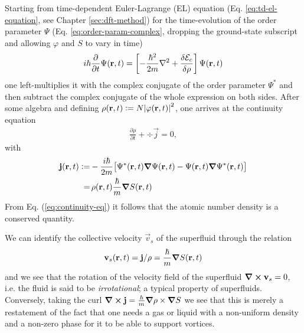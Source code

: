 			Starting from time-dependent Euler-Lagrange (EL) equation (Eq. \ref{eq:td-el-equation}, see Chapter \ref{sec:dft-method}) for the time-evolution of the order parameter $\Psi$ (Eq. \ref{eq:order-param-complex}, dropping the ground-state subscript and allowing $\varphi$ and $S$ to vary in time)
			\begin{align}
				i\hbar\frac{\partial}{\partial t} \Psi({\mathbf r},t) = \left[-\frac{\hbar^2}{2m}\laplacian + \frac{\delta{\cal E}_{c}}{\delta\rho}\right]\Psi(\textbf{r},t)
			\end{align}
			one left-multiplies it with the complex conjugate of the order parameter $\Psi^*$ and then subtract the complex conjugate of the whole expression on both sides. After some algebra and defining $\rho(\bm{\mathrm{r}},t)\vcentcolon=N\abs{\varphi(\bm{\mathrm{r}},t)}^2$, one arrives at the continuity equation
			\begin{align}
				\frac{\partial\rho}{\partial t} + \div{\vec{j}}=0, \label{eq:continuity-eq}
			\end{align}
			with
			\begin{align}
				\bm{\mathrm{j}}(\bm{\mathrm{r}},t) \vcentcolon=& -\frac{i\hbar}{2m}\qty\big[\Psi^*(\bm{\mathrm{r}},t)\grad{\Psi}(\bm{\mathrm{r}},t) - \Psi(\bm{\mathrm{r}},t)\grad{\Psi^*}(\bm{\mathrm{r}},t)] \\
					=&\,\rho(\bm{\mathrm{r}},t)\frac{\hbar}{m}\grad{S(\bm{\mathrm{r}},t)}
			\end{align}
			From Eq. (\ref{eq:continuity-eq}) it follows that the atomic number density is a conserved quantity.
			
			We can identify the collective velocity $\vec{v}_s$ of the superfluid through the relation
			\begin{align}
				\bm{\mathrm{v}}_s(\bm{\mathrm{r}},t) = \bm{\mathrm{j}}/\rho=\frac{\hbar}{m}\grad{S(\bm{\mathrm{r}},t)} \label{eq:velocity-field}
			\end{align}
			and we see that the rotation of the velocity field of the superfluid $\curl{\bm{\mathrm{v}}_s}=0$, i.e. the fluid is said to be \emph{irrotational}; a typical property of superfluids. Conversely, taking the curl $\curl{\bm{\mathrm{j}}}=\frac{\hbar}{m}\grad{\rho}\times\grad{S}$ we see that this is merely a restatement of the fact that one needs a gas or liquid with a non-uniform density and a non-zero phase for it to be able to support vortices.
			
